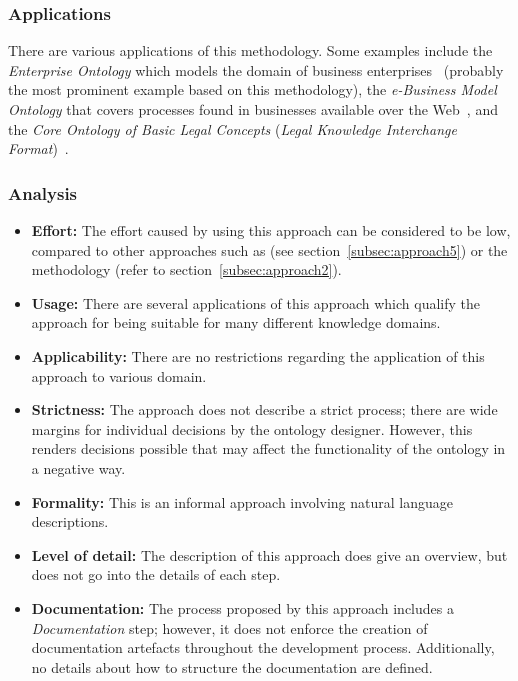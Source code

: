 \subsubsection{Applications}

There are various applications of this methodology. Some examples include the \emph{Enterprise Ontology} which models the domain of business enterprises~\cite{uschold_example1} (probably the most prominent example based on this methodology), the \emph{e-Business Model Ontology} that covers processes found in businesses available over the Web~\cite{uschold_example2}, and the \emph{ Core Ontology of Basic Legal Concepts} (\emph{Legal Knowledge Interchange Format})~\cite{uschold_example3}.

\subsubsection{Analysis}

\begin{itemize}
  \item \textbf{Effort:} The effort caused by using this approach can be considered to be low, compared to other approaches such as \methontology (see section~\ref{subsec:approach5}) or the  methodology (refer to section~\ref{subsec:approach2}).
  
   \item \textbf{Usage:} There are several applications of this approach which qualify the approach for being suitable for many different knowledge domains.
  
  \item \textbf{Applicability:} There are no restrictions regarding the application of this approach to various domain.
  
  \item \textbf{Strictness:} The approach does not describe a strict process; there are wide margins for individual decisions by the ontology designer. However, this renders decisions possible that may affect the functionality of the ontology in a negative way.
  
  \item \textbf{Formality:} This is an informal approach involving natural language descriptions.
  
  \item \textbf{Level of detail:} The description of this approach does give an overview, but does not go into the details of each step.
  
  \item \textbf{Documentation:} The process proposed by this approach includes a \emph{Documentation} step; however, it does not enforce the creation of documentation artefacts throughout the development process. Additionally, no details about how to structure the documentation are defined.
\end{itemize}

